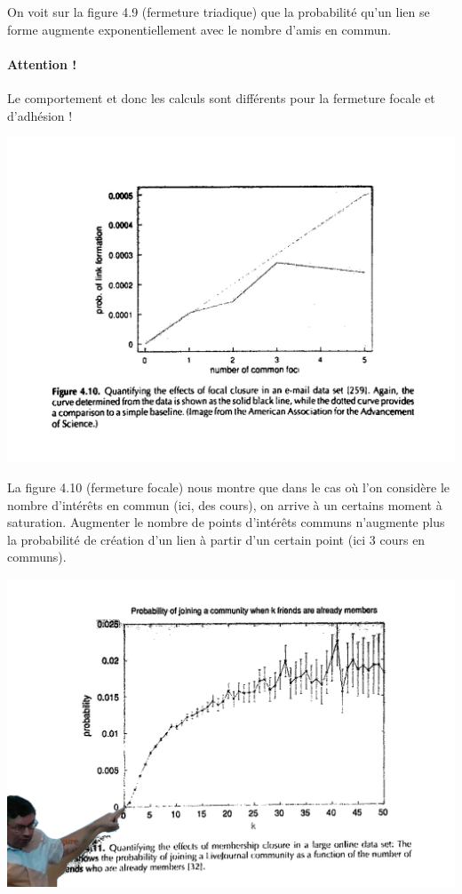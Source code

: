 On voit sur la figure 4.9 (fermeture triadique) que la probabilité qu'un lien se forme augmente exponentiellement avec le nombre d'amis en commun.

\paragraph{Attention !}
Le comportement et donc les calculs sont différents pour la fermeture focale et d'adhésion !

\includegraphics[width=\textwidth]{images/pointsCommuns.jpg}

La figure 4.10 (fermeture focale) nous montre que dans le cas où l'on considère le nombre d'intérêts en commun (ici, des cours), on arrive à un certains moment à saturation. Augmenter le nombre de points d'intérêts communs n'augmente plus la probabilité de création d'un lien à partir d'un certain point (ici 3 cours en communs).

\includegraphics[width=\textwidth]{images/community.jpg}

